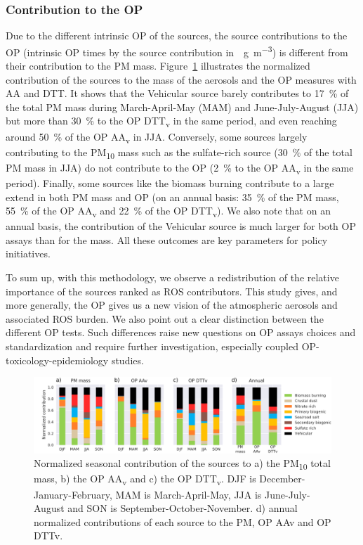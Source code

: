 \documentclass[acp, manuscript]{copernicus}
\begin{document}
\subsubsection{Contribution to the OP}\label{contribution-to-the-op}

Due to the different intrinsic OP of the sources, the source contributions to
the OP (intrinsic OP times by the source contribution in~\unit{\mu g~m^{-3}}) is different from their contribution to the PM
mass.  Figure~\ref{fig:contributions} illustrates the normalized contribution of
the sources to the mass of the aerosols and the OP measures with AA and DTT. It
shows that the Vehicular source barely contributes to 17~\% of the total PM mass
during March-April-May (MAM) and June-July-August (JJA) but more than 30~\% to
the OP DTT\textsubscript{v} in the same period, and even reaching around 50~\%
of the OP AA\textsubscript{v} in JJA. Conversely, some sources largely
contributing to the PM\textsubscript{10} mass such as the sulfate-rich
source (30~\% of the total PM mass in JJA) do not contribute to the OP (2~\% to
the OP AA\textsubscript{v} in the same period). Finally, some sources like the
biomass burning contribute to a large extend in both PM mass and OP (on an
    annual basis: 35~\% of the PM mass, 55~\% of the OP AA\textsubscript{v} and
22~\% of the OP DTT\textsubscript{v}). We also note that on an annual basis, the
contribution of the Vehicular source is much larger for both OP assays than
for the mass.  All these outcomes are key parameters for policy initiatives.

To sum up, with this methodology, we observe a redistribution of the relative
importance of the sources ranked as ROS contributors. This study gives, and more
generally, the OP gives us a new vision of the atmospheric aerosols and
associated ROS burden. We also point out a clear distinction between the
different OP tests. Such differences raise new questions on OP assays choices
and standardization and require further investigation, especially coupled
OP-toxicology-epidemiology studies.

\begin{figure}[h]
    \centering
    \includegraphics[width=\textwidth]{figures/fig06}
    \caption{Normalized seasonal contribution of the sources to a) the
    PM\textsubscript{10} total mass, b) the OP AA\textsubscript{v} and c) the OP
    DTT\textsubscript{v}. DJF is December-January-February, MAM is March-April-May,
JJA is June-July-August and SON is September-October-November. d) annual
normalized contributions of each source to the PM, OP AAv and OP DTTv.}
    \label{fig:contributions}
\end{figure}
\end{document}
